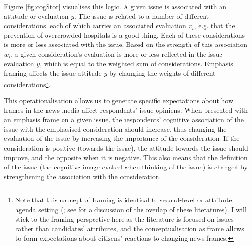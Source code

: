 \documentclass{article}
\begin{document}
Figure \ref{fig:cogStor} visualises this logic. A given issue is associated with an attitude or evaluation $y$. The issue is related to a number of different considerations, each of which carries an associated evaluation $x_i$, e.g. that the prevention of overcrowded hospitals is a good thing. Each of these considerations is more or less associated with the issue. Based on the strength of this association $w_i$, a given consideration's evaluation is more or less reflected in the issue evaluation $y$, which is equal to the weighted sum of considerations. Emphasis framing affects the issue attitude $y$ by changing the weights of different considerations\footnote{Note that this concept of framing is identical to second-level or attribute agenda setting (\cite{Lopezescobar2017, McCombs2000}; see \cite[174]{Mclaren2018} for a discussion of the overlap of these literatures). I will stick to the framing perspective here as the literature is focused on issues rather than candidates' attributes, and the conceptualisation as frame allows to form expectations about citizens' reactions to changing news frames.}.

This operationalisation allows us to generate specific expectations about how frames in the news media affect respondents' issue opinions. When presented with an emphasis frame on a given issue, the respondents' cognitive association of the issue with the emphasised consideration should increase, thus changing the evaluation of the issue by increasing the importance of the consideration. If the consideration is positive (towards the issue), the attitude towards the issue should improve, and the opposite when it is negative. This also means that the definition of the issue (the cognitive image evoked when thinking of the issue) is changed by strengthening the association with the consideration.


\end{document}
